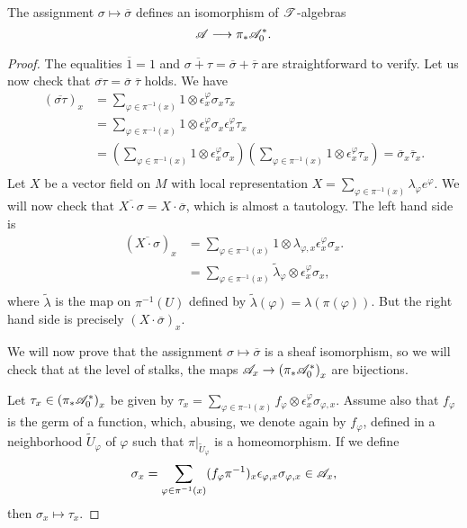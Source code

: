 \begin{theorem}\label{isom_3}
The assignment $\sigma \mapsto \overline{\sigma}$ defines an isomorphism of $\mathscr{T}$-algebras
$$\mathscr{A}\longrightarrow \pi_*\mathscr{A}^*_0.$$
\end{theorem}
\begin{proof}
The equalities $\overline{1}=1$ and $\overline{\sigma +\tau}=\overline{\sigma}+\overline{\tau}$ are straightforward to verify. Let us now check that $\overline{\sigma \tau}=\overline{\sigma}\; \overline{\tau}$ holds. We have
$$
\begin{aligned}
(\overline{\sigma \tau})_x &= \sum_{\varphi \in \pi^{-1}(x)}1\otimes \epsilon^{\varphi}_x\sigma_x\tau_x \\
                           &= \sum_{\varphi \in \pi^{-1}(x)}1\otimes \epsilon^{\varphi}_x\sigma_x \epsilon^{\varphi}_x \tau_x \\
                           &= \left (\sum_{\varphi \in \pi^{-1}(x)}1\otimes \epsilon^{\varphi}_x\sigma_x\right )\left (\sum_{\varphi \in \pi^{-1}(x)}1\otimes \epsilon^{\varphi}_x\tau_x\right )=\overline{\sigma}_x\overline{\tau}_x. \\
\end{aligned}
$$
Let $X$ be a vector field on $M$ with local representation $X=\sum_{\varphi \in \pi^{-1}(x)}\lambda_\varphi e^{\varphi}$. We will now check that $\overline{X\cdot \sigma}=X\cdot \overline{\sigma}$, which is almost a tautology. The left hand side is
$$
\begin{aligned}
(\overline{X\cdot \sigma})_x &= \sum_{\varphi \in \pi^{-1}(x)}1\otimes \lambda_{\varphi ,x}\epsilon^{\varphi}_x\sigma_x.\\
                             &= \sum_{\varphi \in \pi^{-1}(x)}\widetilde{\lambda}_\varphi \otimes \epsilon^{\varphi}_x\sigma_x,\\
\end{aligned}
$$
where $\widetilde{\lambda}$ is the map on $\pi^{-1}(U)$ defined by $\widetilde{\lambda}(\varphi )=\lambda (\pi (\varphi ))$. But the right hand side is precisely $(X\cdot \overline{\sigma})_x$.

We will now prove that the assignment $\sigma \mapsto \overline{\sigma}$ is a sheaf isomorphism, so we will check that at the level of stalks, the maps $\mathscr{A}_x\to \left (\pi_*\mathscr{A}^*_0\right )_x$ are bijections.

Let $\tau_x\in \left (\pi_*\mathscr{A}^*_0\right )_x$ be given by $\tau_x=\sum_{\varphi \in \pi^{-1}(x)}f_{\varphi}\otimes \epsilon^{\varphi}_x\sigma_{\varphi ,x}$. Assume also that $f_\varphi$ is the germ of a function, which, abusing, we denote again by $f_\varphi$, defined in a neighborhood $\widetilde{U}_\varphi$ of $\varphi$ such that $\pi |_{\widetilde{U}_\varphi}$ is a homeomorphism. If we define
$$\sigma_x=\sum_{\varphi \in \pi^{-1}(x)}(f_\varphi\pi^{-1})_x\epsilon_{\varphi ,x}\sigma_{\varphi ,x}\in \mathscr{A}_x,$$
then $\sigma_x\mapsto \tau_x$.


\end{proof}
